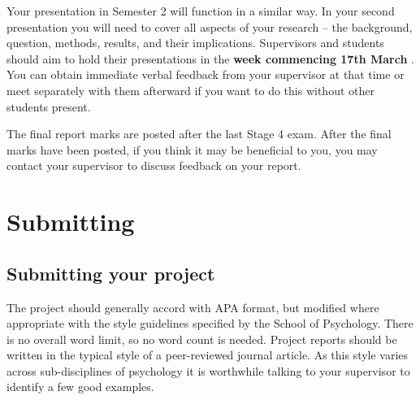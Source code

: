 \documentclass[
]{book}
\begin{document}
Your presentation in Semester 2 will function in a similar way. In your second presentation you will need to cover all aspects of your research -- the background, question, methods, results, and their implications. Supervisors and students should aim to hold their presentations in the \textbf{week commencing 17th March} . You can obtain immediate verbal feedback from your supervisor at that time or meet separately with them afterward if you want to do this without other students present.

The final report marks are posted after the last Stage 4 exam. After the final marks have been posted, if you think it may be beneficial to you, you may contact your supervisor to discuss feedback on your report.

\chapter{Submitting}\label{submitting}

\section{Submitting your project}\label{submitting-your-project}

The project should generally accord with APA format, but modified where appropriate with the style guidelines specified by the School of Psychology. There is no overall word limit, so no word count is needed. Project reports should be written in the typical style of a peer-reviewed journal article. As this style varies across sub-disciplines of psychology it is worthwhile talking to your supervisor to identify a few good examples.
\end{document}
